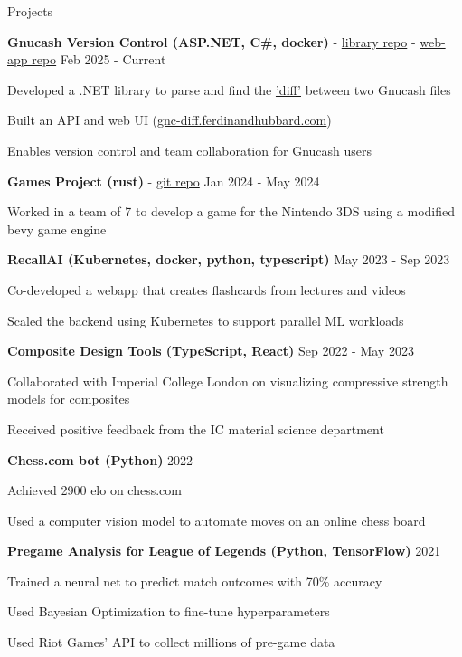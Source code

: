 \documentclass{resume} %
\let\olditemize\itemize
\let\endolditemize\enditemize
\renewenvironment{itemize}{
  \vspace*{-6pt} %
  \olditemize
  \setlength{\itemsep}{0pt}
  \setlength{\topsep}{0pt}         %
  \setlength{\partopsep}{0pt}      %
  \setlength{\parsep}{0pt}         %
  \setlength{\parskip}{0pt}        %
  \setlength{\leftmargin}{1em}
}{
  \endolditemize
  \vspace*{-6pt} %
}
\begin{document}
\begin{rSection}{Projects}

\textbf{Gnucash Version Control (ASP.NET, C\#, docker)} - \href{https://github.com/ferdinandhubbard981/gnucash-diff}{library repo} - \href{https://github.com/ferdinandhubbard981/gnucash-version-control-web}{web-app repo} \hfill Feb 2025 - Current
\begin{itemize}
    \item Developed a .NET library to parse and find the \href{https://en.wikipedia.org/wiki/Diff}{'diff'} between two Gnucash files
    \item Built an API and web UI (\href{https://gnc-diff.ferdinandhubbard.com}{gnc-diff.ferdinandhubbard.com})
    \item Enables version control and team collaboration for Gnucash users
\end{itemize}

\textbf{Games Project (rust)} - \href{https://github.com/Team-Yarg/these\_times\_of\_mine}{git repo} \hfill Jan 2024 - May 2024
\begin{itemize}
    \item Worked in a team of 7 to develop a game for the Nintendo 3DS using a modified bevy game engine
\end{itemize}

\textbf{RecallAI (Kubernetes, docker, python, typescript)} \hfill May 2023 - Sep 2023
\begin{itemize}
    \item Co-developed a webapp that creates flashcards from lectures and videos
    \item Scaled the backend using Kubernetes to support parallel ML workloads
\end{itemize}

\textbf{Composite Design Tools (TypeScript, React)} \hfill Sep 2022 - May 2023
\begin{itemize}
    \item Collaborated with Imperial College London on visualizing compressive strength models for composites
    \item Received positive feedback from the IC material science department
\end{itemize}

\textbf{Chess.com bot (Python)} \hfill 2022
\begin{itemize}
    \item Achieved 2900 elo on chess.com
    \item Used a computer vision model to automate moves on an online chess board
\end{itemize}

\textbf{Pregame Analysis for League of Legends (Python, TensorFlow)} \hfill 2021
\begin{itemize}
    \item Trained a neural net to predict match outcomes with 70\% accuracy
    \item Used Bayesian Optimization to fine-tune hyperparameters
    \item Used Riot Games' API to collect millions of pre-game data
\end{itemize}

\end{rSection}
\end{document}
